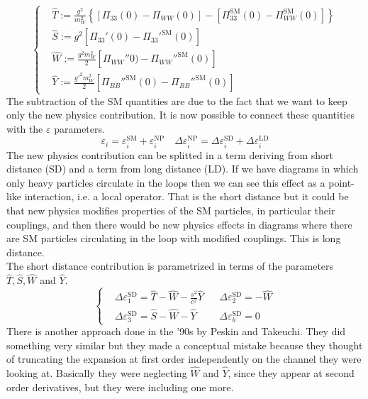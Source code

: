 \documentclass[../main.tex]{subfiles}
\begin{document}
\[
\left\{
\begin{aligned}
&\hat{T}:=\frac{g^2}{m_W^2}\left\{[\Pi_{33}(0)-\Pi_{WW}(0)]-[\Pi_{33}^{\text{SM}}(0)-\Pi_{WW}^{\text{SM}}(0)]\right\}\\
&\hat{S}:=g^2[\Pi_{33}'(0)-\Pi_{33}'^{\text{SM}}(0)]\\
&\hat{W}:=\frac{g^2m_W^2}{2}[\Pi_{WW}''0)-\Pi_{WW}''^{\text{SM}}(0)]\\
&\hat{Y}:=\frac{g'^2m_W^2}{2}[\Pi_{BB}''^{\text{SM}}(0)-\Pi_{BB}''^{\text{SM}}(0)]
\end{aligned}
\right.
\]
The subtraction of the SM quantities are due to the fact that we want to keep only the new physics contribution. It is now possible to connect these quantities with the $\varepsilon$ parameters.
\[
\varepsilon_i=\varepsilon_i^{\text{SM}}+\varepsilon_i^{\text{NP}}\quad \Delta\varepsilon_i^{\text{NP}}=\Delta\varepsilon_i^{\text{SD}}+\Delta\varepsilon_i^{\text{LD}}
\]
The new physics contribution can be splitted in a term deriving from short distance (SD) and a term from long distance (LD). If we have diagrams in which only heavy particles circulate in the loops then we can see this effect as a point-like interaction, i.e. a local operator. That is the short distance but it could be that new physics modifies properties of the SM particles, in particular their couplings, and then there would be new physics effects in diagrams where there are SM particles circulating in the loop with modified couplings. This is long distance.\\
The short distance contribution is parametrized in terms of the parameters $\hat{T}, \hat{S}, \hat{W}$ and $\hat{Y}$.
\[
\left\{
\begin{aligned}
&\Delta\varepsilon_1^{\text{SD}}=\hat{T}-\hat{W}-\frac{s^2}{c^2}\hat{Y} &&\Delta\varepsilon_2^{\text{SD}}=-\hat{W}\\
&\Delta\varepsilon_3^{\text{SD}}=\hat{S}-\hat{W}-\hat{Y} &&\Delta\varepsilon_b^{\text{SD}}=0
\end{aligned}
\right.
\]
There is another approach done in the '90s by Peskin and Takeuchi. They did something very similar but they made a conceptual mistake because they thought of truncating the expansion at first order independently on the channel they were looking at. Basically they were neglecting $\hat{W}$ and $\hat{Y}$, since they appear at second order derivatives, but they were including one more.
\end{document}
